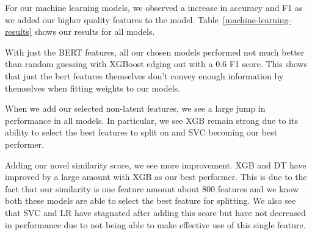 \documentclass{article}
\begin{document}



For our machine learning models, we observed a increase in accuracy and F1 as we added our higher quality features to the model. Table~\ref{machine-learning-results} shows our results for all models.

With just the BERT features, all our chosen models performed not much better than random guessing with XGBoost edging out with a 0.6 F1 score. This shows that just the bert features themselves don't convey enough information by themselves when fitting weights to our models.

When we add our selected non-latent features, we see a large jump in performance in all models. In particular, we see XGB remain strong due to its ability to select the best features to split on and SVC becoming our best performer.

Adding our novel similarity score, we see more improvement. XGB and DT have improved by a large amount with XGB as our best performer. This is due to the fact that our similarity is one feature amount about 800 features and we know both these models are able to select the best feature for splitting. We also see that SVC and LR have stagnated after adding this score but have not decreased in performance due to not being able to make effective use of this single feature.
\end{document}
